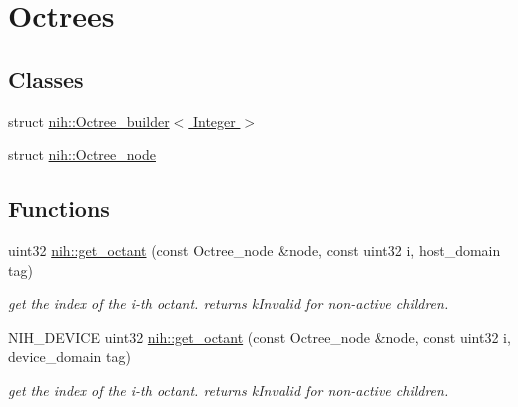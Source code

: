 \hypertarget{group__octrees}{
\section{\-Octrees}
\label{group__octrees}
}
\subsection*{\-Classes}
\begin{DoxyCompactItemize}
\item 
struct \hyperlink{structnih_1_1_octree__builder}{nih\-::\-Octree\-\_\-builder$<$ Integer $>$}
\item 
struct \hyperlink{structnih_1_1_octree__node}{nih\-::\-Octree\-\_\-node}
\end{DoxyCompactItemize}
\subsection*{\-Functions}
\begin{DoxyCompactItemize}
\item 
\hypertarget{group__octrees_gad4574cd2cca5635d516bb19ab9bf7006}{
uint32 \hyperlink{group__octrees_gad4574cd2cca5635d516bb19ab9bf7006}{nih\-::get\-\_\-octant} (const \-Octree\-\_\-node \&node, const uint32 i, host\-\_\-domain tag)}
\label{group__octrees_gad4574cd2cca5635d516bb19ab9bf7006}

\begin{DoxyCompactList}\small\item\em get the index of the i-\/th octant. returns k\-Invalid for non-\/active children. \end{DoxyCompactList}\item 
\hypertarget{group__octrees_ga6aee09758eb16afef4995243bf301505}{
\-N\-I\-H\-\_\-\-D\-E\-V\-I\-C\-E uint32 \hyperlink{group__octrees_ga6aee09758eb16afef4995243bf301505}{nih\-::get\-\_\-octant} (const \-Octree\-\_\-node \&node, const uint32 i, device\-\_\-domain tag)}
\label{group__octrees_ga6aee09758eb16afef4995243bf301505}

\begin{DoxyCompactList}\small\item\em get the index of the i-\/th octant. returns k\-Invalid for non-\/active children. \end{DoxyCompactList}\end{DoxyCompactItemize}
